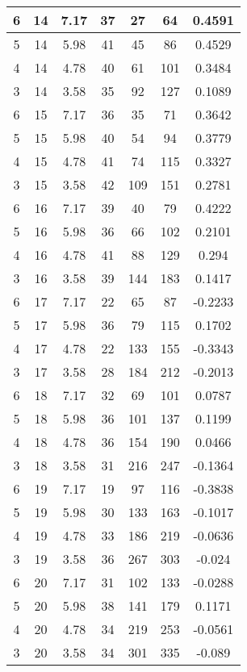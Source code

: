 \documentclass[letterpaper, 12pt]{article}
\begin{document}
\begin{longtable}{|c|c|c|c|c|c|c|}
\hline
6 & 14 & 7.17 & 37 & 27 & 64 & 0.4591 \\
\hline
5 & 14 & 5.98 & 41 & 45 & 86 & 0.4529 \\
\hline
4 & 14 & 4.78 & 40 & 61 & 101 & 0.3484 \\
\hline
3 & 14 & 3.58 & 35 & 92 & 127 & 0.1089 \\
\hline
6 & 15 & 7.17 & 36 & 35 & 71 & 0.3642 \\
\hline
5 & 15 & 5.98 & 40 & 54 & 94 & 0.3779 \\
\hline
4 & 15 & 4.78 & 41 & 74 & 115 & 0.3327 \\
\hline
3 & 15 & 3.58 & 42 & 109 & 151 & 0.2781 \\
\hline
6 & 16 & 7.17 & 39 & 40 & 79 & 0.4222 \\
\hline
5 & 16 & 5.98 & 36 & 66 & 102 & 0.2101 \\
\hline
4 & 16 & 4.78 & 41 & 88 & 129 & 0.294 \\
\hline
3 & 16 & 3.58 & 39 & 144 & 183 & 0.1417 \\
\hline
6 & 17 & 7.17 & 22 & 65 & 87 & -0.2233 \\
\hline
5 & 17 & 5.98 & 36 & 79 & 115 & 0.1702 \\
\hline
4 & 17 & 4.78 & 22 & 133 & 155 & -0.3343 \\
\hline
3 & 17 & 3.58 & 28 & 184 & 212 & -0.2013 \\
\hline
6 & 18 & 7.17 & 32 & 69 & 101 & 0.0787 \\
\hline
5 & 18 & 5.98 & 36 & 101 & 137 & 0.1199 \\
\hline
4 & 18 & 4.78 & 36 & 154 & 190 & 0.0466 \\
\hline
3 & 18 & 3.58 & 31 & 216 & 247 & -0.1364 \\
\hline
6 & 19 & 7.17 & 19 & 97 & 116 & -0.3838 \\
\hline
5 & 19 & 5.98 & 30 & 133 & 163 & -0.1017 \\
\hline
4 & 19 & 4.78 & 33 & 186 & 219 & -0.0636 \\
\hline
3 & 19 & 3.58 & 36 & 267 & 303 & -0.024 \\
\hline
6 & 20 & 7.17 & 31 & 102 & 133 & -0.0288 \\
\hline
5 & 20 & 5.98 & 38 & 141 & 179 & 0.1171 \\
\hline
4 & 20 & 4.78 & 34 & 219 & 253 & -0.0561 \\
\hline
3 & 20 & 3.58 & 34 & 301 & 335 & -0.089 \\
\hline
\end{longtable}
\end{document}
